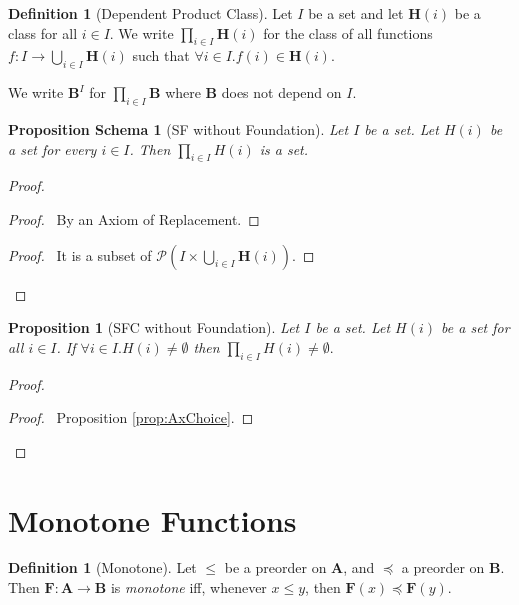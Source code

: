 \documentclass{book}
\let\qed\relax
\newtheorem{prop}[ax]{Proposition}
\newtheorem{props}[ax]{Proposition Schema}
\theoremstyle{definition}
\newtheorem{df}[ax]{Definition}
\begin{document}
\begin{df}[Dependent Product Class]
Let $I$ be a set and let $\mathbf{H}(i)$ be a class for all $i \in I$. We write $\prod_{i \in I} \mathbf{H}(i)$ for the class of all functions $f : I \rightarrow \bigcup_{i \in I} \mathbf{H}(i)$ such that $\forall i \in I. f(i) \in \mathbf{H}(i)$.

We write $\mathbf{B}^I$ for $\prod_{i \in I} \mathbf{B}$ where $\mathbf{B}$ does not depend on $I$.
\end{df}

\begin{props}[SF without Foundation]
Let $I$ be a set. Let $H(i)$ be a set for every $i \in I$. Then $\prod_{i \in I} H(i)$ is a set.
\end{props}

\begin{proof}
\pf
{}
\begin{proof}
	\pf\ By an Axiom of Replacement.
\end{proof}
\begin{proof}
	\pf\ It is a subset of $\mathcal{P}\left( I \times \bigcup_{i \in I} \mathbf{H}(i) \right)$.
\end{proof}
\qed
\end{proof}

\begin{prop}[SFC without Foundation]
Let $I$ be a set. Let $H(i)$ be a set for all $i \in I$. If $\forall i \in I. H(i) \neq \emptyset$ then $\prod_{i \in I} H(i) \neq \emptyset.$
\end{prop}

\begin{proof}
\pf
{}
\begin{proof}
	\pf\ Proposition \ref{prop:AxChoice}.
\end{proof}
\qed
\end{proof}

\section{Monotone Functions}

\begin{df}[Monotone]
Let $\leq$ be a preorder on $\mathbf{A}$, and $\preccurlyeq$ a preorder on $\mathbf{B}$. Then $\mathbf{F} : \mathbf{A} \rightarrow \mathbf{B}$ is \emph{monotone} iff, whenever $x \leq y$, then $\mathbf{F}(x) \preccurlyeq \mathbf{F}(y)$.
\end{df}
\end{document}
